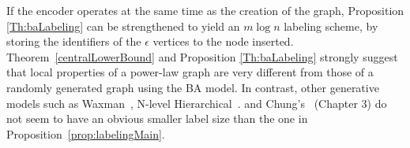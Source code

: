 If the encoder operates at the same time as the creation of the graph, Proposition \ref{Th:baLabeling} can be strengthened to yield  an $m \log n$ labeling scheme, by   storing the  identifiers of the $\epsilon$ vertices to the node inserted.
Theorem~\ref{centralLowerBound} and Proposition \ref{Th:baLabeling} strongly suggest that local properties of a power-law graph  are very different from those  of  a randomly generated graph using the BA model.
  In contrast, other generative models such as   Waxman~\cite{waxman1988routing}, N-level Hierarchical~\cite{calvert1997modeling}.
and Chung's~\cite{chung2006complex} (Chapter 3)  do not seem to have an obvious smaller label size than the one in Proposition~\ref{prop:labelingMain}.

